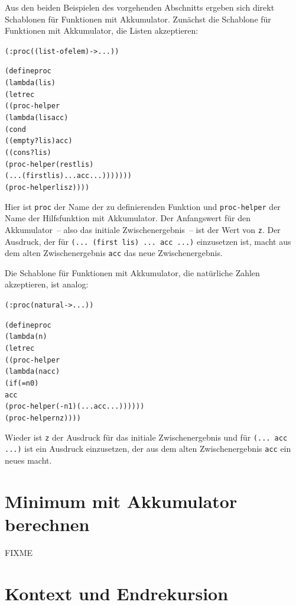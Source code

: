 Aus den beiden Beispielen des vorgehenden Abschnitts ergeben sich
direkt Schablonen für Funktionen mit Akkumulator.  Zunächst die
Schablone für Funktionen mit Akkumulator, die Listen akzeptieren:
%
\begin{alltt}
(: proc ((list-of elem) -> ...))

(define proc
  (lambda (lis)
    (letrec
       ((proc-helper
         (lambda (lis acc)
            (cond
              ((empty? lis) acc)
              ((cons? lis)
                 (proc-helper (rest lis)
                    (... (first lis) ... acc ...)))))))
    (proc-helper lis z))))
\end{alltt}
%
Hier ist \texttt{proc} der Name der zu definierenden Funktion
und \texttt{proc-helper} der Name der Hilfsfunktion mit
Akkumulator.  Der Anfangswert für den Akkumulator~-- also das initiale
Zwischenergebnis~-- ist der Wert von \texttt{z}.  Der
Ausdruck, der für \texttt{(... (first lis) ... acc ...)} einzusetzen
ist, macht aus dem alten Zwischenergebnis \texttt{acc} das neue
Zwischenergebnis.

Die Schablone für Funktionen mit Akkumulator, die natürliche Zahlen
akzeptieren, ist analog:
%
\begin{alltt}
(: proc (natural -> ...))

(define proc
  (lambda (n)
    (letrec
      ((proc-helper
        (lambda (n acc)
          (if (= n 0)
              acc
              (proc-helper (- n 1) (... acc ...))))))
    (proc-helper n z))))
\end{alltt}
%
Wieder ist \texttt{z} der Ausdruck für das initiale Zwischenergebnis
und für \texttt{(... acc ...)} ist ein Ausdruck einzusetzen, der aus
dem alten Zwischenergebnis \texttt{acc} ein neues macht.

\section{Minimum mit Akkumulator berechnen}
\label{sec:min-akku}

FIXME

\section{Kontext und Endrekursion}
\label{sec:iteration}

